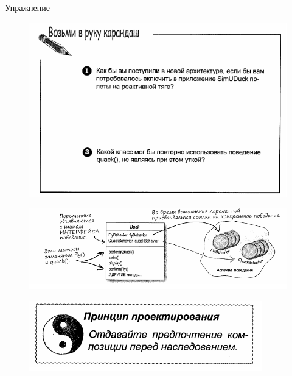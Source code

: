 \documentclass{beamer}
\begin{document}
\begin{frame}{Упражнение}
\begin{figure}[h]
\centering
\includegraphics[scale=0.5]{images/lec09-pic14.png}
\label{pic-sort}
\end{figure}
\end{frame}

\begin{frame}
\begin{figure}[h]
\centering
\includegraphics[scale=0.5]{images/lec09-pic15.png}
\label{pic-sort}
\end{figure}
\begin{figure}[h]
\centering
\includegraphics[scale=1]{images/lec09-pic17.png}
\label{pic-sort}
\end{figure}

\end{frame}
\end{document}
